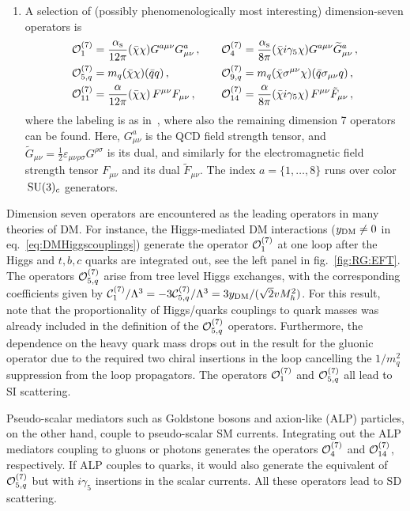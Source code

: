 \begin{enumerate}
\item[7)] A selection of (possibly phenomenologically most interesting) dimension-seven operators is
\allowdisplaybreaks
\begin{align}
{\cal O}_{1}^{(7)} & = \frac{\alpha_{\rm s}}{12\pi} (\bar \chi \chi)
 G^{a\mu\nu}G_{\mu\nu}^a\,, 
& {\cal O}_{4}^{(7)}& = \frac{\alpha_{\rm s}}{8\pi}
(\bar \chi i \gamma_5 \chi) G^{a\mu\nu}\widetilde G_{\mu\nu}^a \,, \label{eq:dim7:Q3Q4:light}
\\
{\cal O}_{5,q}^{(7)} & = m_q (\bar \chi \chi)( \bar q q)\,, 
&
{\cal O}_{9,q}^{(7)} & = m_q (\bar \chi \sigma^{\mu\nu} \chi) (\bar q \sigma_{\mu\nu} q)\,, 
 \label{eq:dim7EW:Q9Q10:light} 
\\
\label{eq:Q7:11}
{\cal O}^{(7)}_{11} &= \frac{\alpha}{12\pi}(\bar{\chi}\chi)\,
F^{\mu\nu} F_{\mu\nu}\,,  &\quad
{\cal O}^{(7)}_{14} &=  \frac{\alpha}{8\pi}(\bar{\chi}i\gamma_5\chi)\, F^{\mu\nu} \tilde{F}_{\mu\nu}\,,
\end{align}
where the labeling is as in~\cite{Brod:2017bsw}, where also the remaining dimension 7 operators can be found.
Here, $G_{\mu\nu}^a$ is the QCD field strength tensor, and
$\widetilde G_{\mu\nu} = \frac{1}{2}\varepsilon_{\mu\nu\rho\sigma}
G^{\rho\sigma}$ is its dual, and similarly for the electromagnetic 
field strength tensor $F_{\mu\nu}$ and its dual $\tilde F_{\mu\nu}$. 
The index $a=\{1,\dots,8\}$ runs over color $\,{\rm SU}(3)_c$ generators. 
\end{enumerate}
Dimension seven operators are encountered as the leading operators in many theories of DM. 
For instance, the Higgs-mediated DM interactions ($y_{\rm DM}\ne0$ in eq.~\eqref{eq:DMHiggscouplings}) generate the operator ${\cal O}_{1}^{(7)}$ 
at one loop after the Higgs and $t, b,c$ quarks are integrated out, see the left panel in fig.~\ref{fig:RG:EFT}. 
The operators ${\cal O}_{5,q}^{(7)}$ arise from tree level Higgs exchanges, with the corresponding coefficients given by 
${\cal C}_{1}^{(7)}/\Lambda^3 =- 3{\cal C}_{5,q}^{(7)}/\Lambda^3= 3 y_{\rm DM} /(\sqrt 2 v M_h^2 )$.  
For this result, note that the proportionality of Higgs/quarks couplings to quark masses was already included in the definition of the ${\cal O}_{5,q}^{(7)}$ operators. Furthermore, the dependence on the heavy quark mass drops out in the result for the gluonic operator due to the required two chiral insertions in the loop cancelling the $1/m_q^2$ suppression from the loop propagators. The operators ${\cal O}_{1}^{(7)}$ and ${\cal O}_{5,q}^{(7)}$ all lead to SI scattering. 

\smallskip

Pseudo-scalar mediators such as Goldstone bosons and axion-like (ALP) particles,
on the other hand, couple to pseudo-scalar SM currents. Integrating out the ALP mediators coupling to gluons or photons
generates the operators ${\cal O}_{4}^{(7)}$ and ${\cal O}_{14}^{(7)}$, respectively. If ALP couples to quarks, it would also generate the equivalent of ${\cal O}_{5,q}^{(7)}$ but with $i\gamma_5$ insertions in the scalar currents. All these operators lead to SD scattering.


